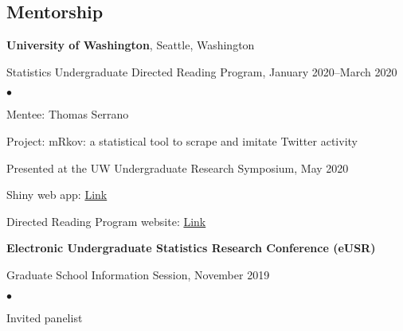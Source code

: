 \documentclass[margin,centered]{res}
\newenvironment{list1}{
  \begin{list}{\ding{113}}{%
      \setlength{\itemsep}{0in}
      \setlength{\parsep}{0in} \setlength{\parskip}{0in}
      \setlength{\topsep}{0in} \setlength{\partopsep}{0in}
      \setlength{\leftmargin}{0.17in}}}{\end{list}}
\newenvironment{list2}{
  \begin{list}{$\bullet$}{%
      \setlength{\itemsep}{0in}
      \setlength{\parsep}{0in} \setlength{\parskip}{0in}
      \setlength{\topsep}{0in} \setlength{\partopsep}{0in}
      \setlength{\leftmargin}{0.2in}}}{\end{list}}
\begin{document}
\begin{resume}
\section{\sc Mentorship}

{\bf University of Washington}, Seattle, Washington
\begin{list1}
\item[] Statistics Undergraduate Directed Reading Program, January 2020--March 2020
\begin{list2}
\vspace*{.05in}
\item Mentee: Thomas Serrano
\item Project: m{R}kov: a statistical tool to scrape and imitate {T}witter activity
\item Presented at the UW Undergraduate Research Symposium, May 2020
\item Shiny web app: \href{https://serrat839.shinyapps.io/mRkov_shiny/}{Link}
\item Directed Reading Program website: \href{https://spa-drp.github.io}{Link}
\end{list2}
\end{list1}

{\bf Electronic Undergraduate Statistics Research Conference (eUSR)}
\begin{list1}
\item[] Graduate School Information Session, November 2019
\begin{list2}
\vspace*{.05in}
\item Invited panelist
\end{list2}
\end{list1}








\end{resume}
\end{document}
